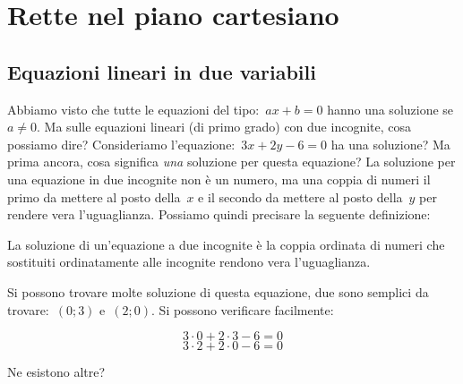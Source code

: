 
\chapter{Rette nel piano cartesiano}

\section{Equazioni lineari in due variabili}
\label{sec:retta_equazionilineari}

Abbiamo visto che tutte le equazioni del tipo:~\(ax+b=0\) hanno una soluzione
se \(a\neq0\). Ma sulle equazioni lineari (di primo grado) con due incognite, 
cosa possiamo dire? Consideriamo l'equazione:~\(3x + 2y - 6 = 0\) 
ha una soluzione? Ma prima ancora, cosa significa \emph{una} soluzione per 
questa equazione? La soluzione per una equazione in due incognite  non è un 
numero, ma una coppia di numeri il primo da mettere al posto della~\(x\) e il
secondo da mettere al posto della~\(y\) per rendere vera l'uguaglianza.
Possiamo quindi precisare la seguente definizione:

\begin{definizione}
 La soluzione di un'equazione a due incognite è la coppia ordinata di numeri 
 che sostituiti ordinatamente alle incognite rendono vera l'uguaglianza.
\end{definizione}

Si possono trovare molte soluzione di questa equazione, due sono 
semplici da trovare:~\((0; 3)\) e~\((2; 0)\). Si possono verificare facilmente:

\[3 \cdot 0 + 2 \cdot 3 - 6 = 0\]
\[3 \cdot 2 + 2 \cdot 0 - 6 = 0\]

Ne esistono altre?

